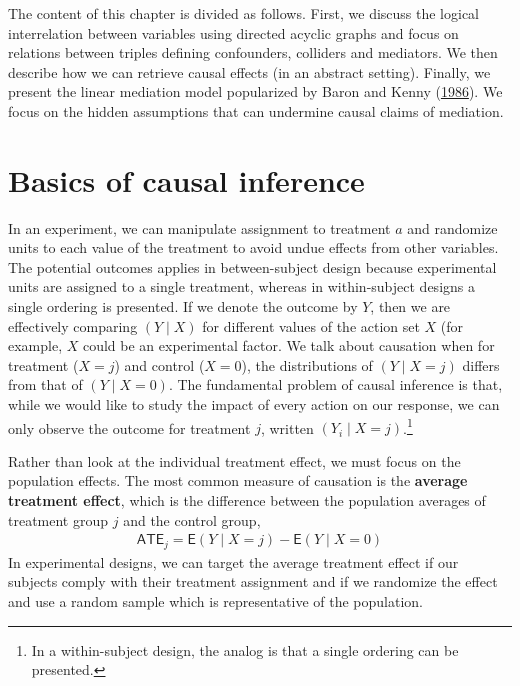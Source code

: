 \documentclass[
  11pt,
  letterpaper,
]{scrbook}
\theoremstyle{definition}
\theoremstyle{remark}
\begin{document}
The content of this chapter is divided as follows. First, we discuss the
logical interrelation between variables using directed acyclic graphs
and focus on relations between triples defining confounders, colliders
and mediators. We then describe how we can retrieve causal effects (in
an abstract setting). Finally, we present the linear mediation model
popularized by Baron and Kenny
(\protect\hyperlink{ref-Baron.Kenny:1986}{1986}). We focus on the hidden
assumptions that can undermine causal claims of mediation.

\hypertarget{basics-of-causal-inference}{%
\section{Basics of causal inference}\label{basics-of-causal-inference}}

In an experiment, we can manipulate assignment to treatment \(a\) and
randomize units to each value of the treatment to avoid undue effects
from other variables. The potential outcomes applies in between-subject
design because experimental units are assigned to a single treatment,
whereas in within-subject designs a single ordering is presented. If we
denote the outcome by \(Y\), then we are effectively comparing
\((Y \mid X)\) for different values of the action set \(X\) (for
example, \(X\) could be an experimental factor. We talk about causation
when for treatment (\(X=j\)) and control (\(X=0\)), the distributions of
\((Y \mid X=j)\) differs from that of \((Y \mid X=0)\). The fundamental
problem of causal inference is that, while we would like to study the
impact of every action on our response, we can only observe the outcome
for treatment \(j\), written \((Y_i \mid X=j)\).\footnote{In a
  within-subject design, the analog is that a single ordering can be
  presented.}

Rather than look at the individual treatment effect, we must focus on
the population effects. The most common measure of causation is the
\textbf{average treatment effect}, which is the difference between the
population averages of treatment group \(j\) and the control group,
\begin{align*}
\textsf{ATE}_j = \mathsf{E}(Y \mid X=j) - \mathsf{E}(Y \mid X=0)
\end{align*} In experimental designs, we can target the average
treatment effect if our subjects comply with their treatment assignment
and if we randomize the effect and use a random sample which is
representative of the population.
\end{document}
